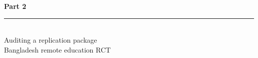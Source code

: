 \documentclass[aspectratio=169, 10pt]{beamer}
\begin{document}
%

{
\begin{frame}
\centering\vfill
{\fontsize{22}{28}\bfseries\selectfont\color{white} Part 2}\\[6pt]
{\color{UVMGold}\rule{5cm}{0.8pt}}\\[6pt]
{\normalsize\color{UVMGold} Auditing a replication package}\\[4pt]
{\small\color{PaleSage} Bangladesh remote education RCT}
\vfill
\end{frame}
}
\end{document}
